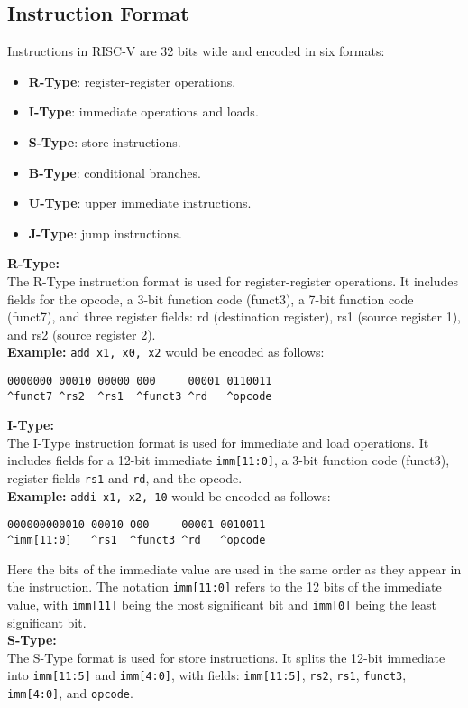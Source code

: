 \documentclass[sigconf]{acmart}
\begin{document}
\subsection{Instruction Format}
Instructions in RISC-V are 32 bits wide and encoded in six formats:
\begin{itemize}
  \item \textbf{R-Type}: register-register operations.
  \item \textbf{I-Type}: immediate operations and loads.
  \item \textbf{S-Type}: store instructions.
  \item \textbf{B-Type}: conditional branches.
  \item \textbf{U-Type}: upper immediate instructions.
  \item \textbf{J-Type}: jump instructions.
\end{itemize}
%
\textbf{R-Type:} \\
The R-Type instruction format is used for register-register operations. It includes fields for the opcode, a 3-bit function code (funct3), a 7-bit function code (funct7), and three register fields: rd (destination register), rs1 (source register 1), and rs2 (source register 2). \\
\textbf{Example:} \texttt{add x1, x0, x2} would be encoded as follows:
\begin{verbatim}
0000000 00010 00000 000     00001 0110011
^funct7 ^rs2  ^rs1  ^funct3 ^rd   ^opcode
\end{verbatim}\medskip
%
\textbf{I-Type:} \\
The I-Type instruction format is used for immediate and load operations. It includes fields for a 12-bit immediate \texttt{imm[11:0]}, a 3-bit function code (funct3), register fields \texttt{rs1} and \texttt{rd}, and the opcode. \\
\textbf{Example:} \texttt{addi x1, x2, 10} would be encoded as follows:
\begin{verbatim}
000000000010 00010 000     00001 0010011
^imm[11:0]   ^rs1  ^funct3 ^rd   ^opcode
\end{verbatim}\medskip
Here the bits of the immediate value are used in the same order as they appear in the instruction. The notation \texttt{imm[11:0]} refers to the 12 bits of the immediate value, with \texttt{imm[11]} being the most significant bit and \texttt{imm[0]} being the least significant bit. \\
\medskip
%
\textbf{S-Type:} \\
The S-Type format is used for store instructions. It splits the 12-bit immediate into \texttt{imm[11:5]} and \texttt{imm[4:0]}, with fields: \texttt{imm[11:5]}, \texttt{rs2}, \texttt{rs1}, \texttt{funct3}, \texttt{imm[4:0]}, and \texttt{opcode}. \\
\end{document}

